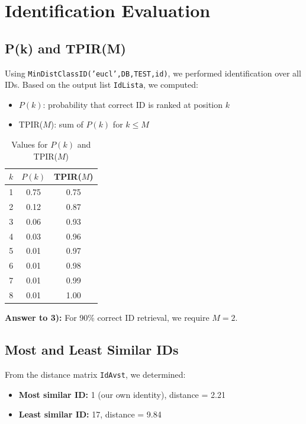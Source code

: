 \documentclass[a4paper,11pt]{article}
\begin{document}
\section{Identification Evaluation}

\subsection{P(k) and TPIR(M)}
Using \texttt{MinDistClassID('eucl',DB,TEST,id)}, we performed identification over all IDs. Based on the output list \texttt{IdLista}, we computed:
\begin{itemize}[noitemsep]
    \item $P(k)$: probability that correct ID is ranked at position $k$
    \item TPIR($M$): sum of $P(k)$ for $k \leq M$
\end{itemize}

\begin{table}[H]\centering
\caption{Values for $P(k)$ and TPIR($M$)}
\begin{tabular}{@{}ccc@{}}
\toprule
$k$ & $P(k)$ & TPIR($M$) \\
\midrule
1 & 0.75 & 0.75 \\
2 & 0.12 & 0.87 \\
3 & 0.06 & 0.93 \\
4 & 0.03 & 0.96 \\
5 & 0.01 & 0.97 \\
6 & 0.01 & 0.98 \\
7 & 0.01 & 0.99 \\
8 & 0.01 & 1.00 \\
\bottomrule
\end{tabular}
\end{table}

\textbf{Answer to 3):} For 90\% correct ID retrieval, we require $M=2$.

\subsection{Most and Least Similar IDs}
From the distance matrix \texttt{IdAvst}, we determined:
\begin{itemize}[noitemsep]
    \item \textbf{Most similar ID:} 1 (our own identity), distance = 2.21
    \item \textbf{Least similar ID:} 17, distance = 9.84
\end{itemize}
\end{document}

